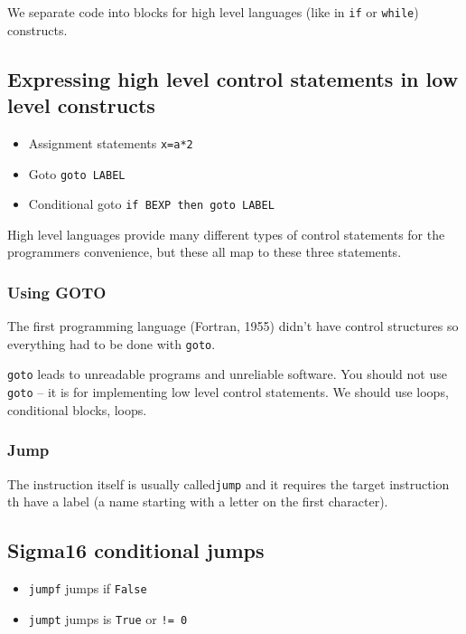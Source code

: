 We separate code into blocks for high level languages (like in \texttt{if} or \texttt{while}) constructs.

\subsection{Expressing high level control statements in low level constructs}\label{sub:expressing_high_level_control_statenmens_in_low_level_contrsucts}

\begin{itemize}
	\item Assignment statements \texttt{x=a*2}
	\item Goto \texttt{goto LABEL}
	\item Conditional goto \texttt{if BEXP then goto LABEL}
\end{itemize}
%
High level languages provide many different types of control statements for the programmers convenience, but these all map to these three statements.

\subsubsection{Using GOTO}\label{ssub:using_goto}

The first  programming language (Fortran, 1955) didn't have control structures so everything had to be done with \texttt{goto}.

\texttt{goto} leads to unreadable programs and unreliable software.
You should not use \texttt{goto} -- it is for implementing low level control statements.
We should use loops, conditional blocks, loops.

\subsubsection{Jump}\label{ssub:jump}

The instruction itself is usually called\texttt{jump} and it requires the target instruction th have a label (a name starting with a letter on the first character).

\subsection{Sigma16 conditional jumps}\label{sub:sigma16_conditional_jumps}

\begin{itemize}
	\item \texttt{jumpf} jumps if \texttt{False}
	\item \texttt{jumpt} jumps is \texttt{True} or \texttt{!= 0}
\end{itemize}

